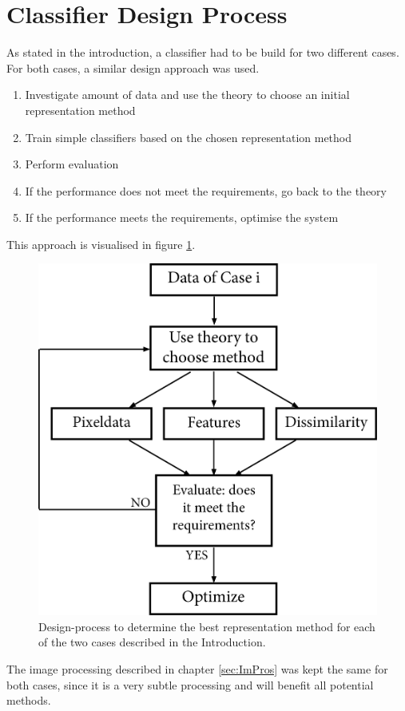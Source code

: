 \section{Classifier Design Process}
\label{sec:ClasDes}
As stated in the introduction, a classifier had to be build for two different cases. For both cases, a similar design approach was used. \begin{enumerate}
	\item Investigate amount of data and use the theory to choose an initial representation method
	\item Train simple classifiers based on the chosen representation method
	\item Perform evaluation
	\item If the performance does not meet the requirements, go back to the theory
	\item If the performance meets the requirements, optimise the system
\end{enumerate}
This approach is visualised in figure \ref{fig:case_design}.
\begin{figure}[H]
	\centering
	\includegraphics[scale=0.55]{images/Case_Design.jpg}
	\caption{Design-process to determine the best representation method for each of the two cases described in the Introduction.}
	\label{fig:case_design}
\end{figure}
\noindent The image processing described in chapter \ref{sec:ImPros} was kept the same for both cases, since it is a very subtle processing and will benefit all potential methods.

